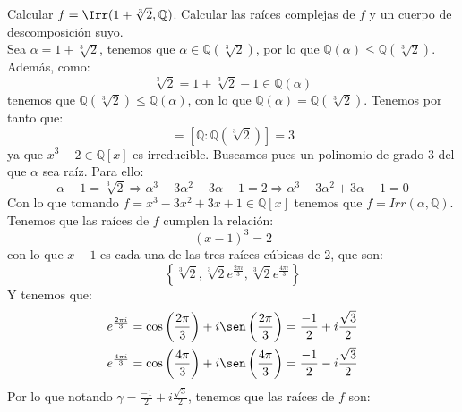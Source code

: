 \begin{ejercicio}
    Calcular $f= \Irr(1+\sqrt[3]{2},\mathbb{Q})$. Calcular las raíces complejas de $f$ y un cuerpo de descomposición suyo.\\

    \noindent
    Sea $\alpha = 1+ \sqrt[3]{2}$, tenemos que $\alpha\in \mathbb{Q}\left(\sqrt[3]{2}\right)$, por lo que $\mathbb{Q}(\alpha)\leq \mathbb{Q}\left(\sqrt[3]{2}\right)$. Además, como:
    \begin{equation*}
        \sqrt[3]{2} = 1+\sqrt[3]{2} - 1 \in \mathbb{Q}(\alpha)
    \end{equation*}
    tenemos que $\mathbb{Q}\left(\sqrt[3]{2}\right) \leq \mathbb{Q}(\alpha)$, con lo que $\mathbb{Q}(\alpha) = \mathbb{Q}\left(\sqrt[3]{2}\right)$. Tenemos por tanto que:
    \begin{equation*}
        [\mathbb{Q}:\mathbb{Q}(\alpha)] = [\mathbb{Q}:\mathbb{Q}\left(\sqrt[3]{2}\right)] = 3
    \end{equation*}
    ya que $x^3-2\in \mathbb{Q}[x]$ es irreducible. Buscamos pues un polinomio de grado 3 del que $\alpha$ sea raíz. Para ello:
    \begin{equation*}
        \alpha - 1 = \sqrt[3]{2} \Longrightarrow \alpha^3 - 3\alpha^2 + 3\alpha - 1 = 2 \Longrightarrow \alpha^3 - 3\alpha^2 + 3\alpha + 1 = 0
    \end{equation*}
    Con lo que tomando $f = x^3-3x^2+3x+1\in \mathbb{Q}[x]$ tenemos que $f=Irr(\alpha,\mathbb{Q})$. Tenemos que las raíces de $f$ cumplen la relación:
    \begin{equation*}
        {(x-1)}^{3} = 2
    \end{equation*}
    con lo que $x-1$ es cada una de las tres raíces cúbicas de 2, que son:
    \begin{equation*}
        \left\{\sqrt[3]{2}, \sqrt[3]{2}e^{\frac{2\pi i}{3}}, \sqrt[3]{2}e^{\frac{4\pi i}{3}}\right\}
    \end{equation*}
    Y tenemos que:
    \begin{align*}
        e^{\frac{2\pi i}{3}} &= \cos\left(\frac{2\pi}{3}\right) + i\sen\left(\frac{2\pi}{3}\right) = \dfrac{-1}{2}+i\dfrac{\sqrt{3}}{2} \\
        e^{\frac{4\pi i}{3}} &= \cos\left(\frac{4\pi}{3}\right) + i\sen\left(\frac{4\pi}{3}\right) = \dfrac{-1}{2}-i\dfrac{\sqrt{3}}{2} \\
    \end{align*}
    Por lo que notando $\gamma = \frac{-1}{2}+i\frac{\sqrt{3}}{2}$, tenemos que las raíces de $f$ son:

\end{ejercicio}
